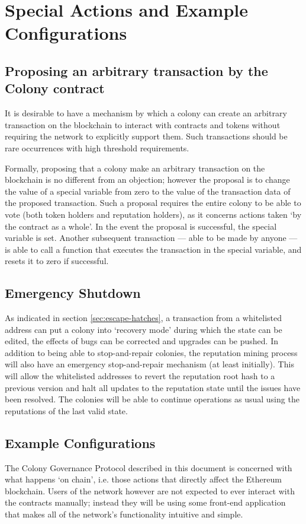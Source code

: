 

\section{Special Actions and Example Configurations}\label{sec:special-cases}

\subsection{Proposing an arbitrary transaction by the Colony contract}\label{sec:arbitrary-transaction}
It is desirable to have a mechanism by which a colony can create an arbitrary transaction on the blockchain to interact with contracts and tokens without requiring the network to explicitly support them. Such transactions should be rare occurrences with high threshold requirements.

Formally, proposing that a colony make an arbitrary transaction on the blockchain is no different from an objection; however the proposal is to change the value of a special variable from zero to the value of the transaction data of the proposed transaction. Such a proposal requires the entire colony to be able to vote (both token holders and reputation holders), as it concerns actions taken `by the contract as a whole'. In the event the proposal is successful, the special variable is set. Another subsequent transaction --- able to be made by anyone --- is able to call a function that executes the transaction in the special variable, and resets it to zero if successful.


\subsection{Emergency Shutdown}\label{sec:big-red-button}
As indicated in section \ref{sec:escape-hatches}, a transaction from a whitelisted address can put a colony into `recovery mode' during which the state can be edited, the effects of bugs can be corrected and upgrades can be pushed. In addition to being able to stop-and-repair colonies, the reputation mining process will also have an emergency stop-and-repair mechanism (at least initially). This will allow the whitelisted addresses to revert the reputation root hash to a previous version and halt all updates to the reputation state until the issues have been resolved. The colonies will be able to continue operations as usual using the reputations of the last valid state.

\subsection{Example Configurations}\label{sec:example-configs}
The Colony Governance Protocol described in this document is concerned with what happens `on chain', i.e. those actions that directly affect the Ethereum blockchain. Users of the network however are not expected to ever interact with the contracts manually; instead they will be using some front-end application that makes all of the network's functionality intuitive and simple.

